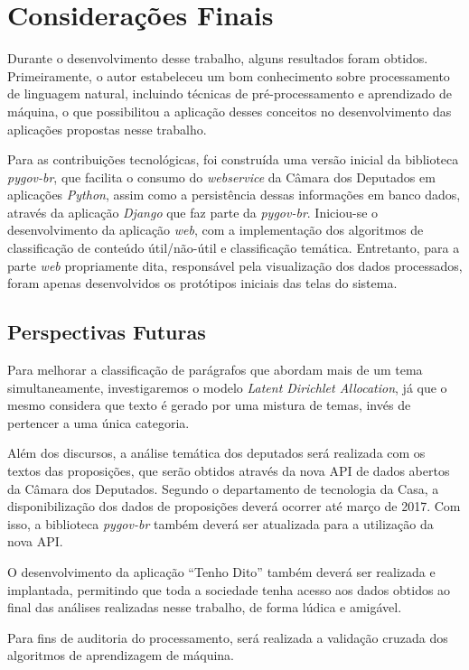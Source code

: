 \chapter{Considerações Finais}

Durante o desenvolvimento desse trabalho, alguns resultados foram obtidos. Primeiramente, o autor estabeleceu um bom conhecimento sobre processamento de linguagem natural, incluindo técnicas de pré-processamento e aprendizado de máquina, o que possibilitou a aplicação desses conceitos no desenvolvimento das aplicações propostas nesse trabalho.

Para as contribuições tecnológicas, foi construída uma versão inicial da biblioteca \textit{pygov-br}, que facilita o consumo do \textit{webservice} da Câmara dos Deputados em aplicações \textit{Python}, assim como a persistência dessas informações em banco dados, através da aplicação \textit{Django} que faz parte da \textit{pygov-br}. Iniciou-se o desenvolvimento da aplicação \textit{web}, com a implementação dos algoritmos de classificação de conteúdo útil/não-útil e classificação temática. Entretanto, para a parte \textit{web} propriamente dita, responsável pela visualização dos dados processados, foram apenas desenvolvidos os protótipos iniciais das telas do sistema.

\section{Perspectivas Futuras}

Para melhorar a classificação de parágrafos que abordam mais de um tema simultaneamente, investigaremos o modelo \textit{Latent Dirichlet Allocation}, já que o mesmo considera que texto é gerado por uma mistura de temas, invés de pertencer a uma única categoria.

Além dos discursos, a análise temática dos deputados será realizada com os textos das proposições, que serão obtidos através da nova API de dados abertos da Câmara dos Deputados. Segundo o departamento de tecnologia da Casa, a disponibilização dos dados de proposições deverá ocorrer até março de 2017. Com isso, a biblioteca \textit{pygov-br} também deverá ser atualizada para a utilização da nova API.

O desenvolvimento da aplicação ``Tenho Dito'' também deverá ser realizada e implantada, permitindo que toda a sociedade tenha acesso aos dados obtidos ao final das análises realizadas nesse trabalho, de forma lúdica e amigável.

Para fins de auditoria do processamento, será realizada a validação cruzada dos algoritmos de aprendizagem de máquina.

